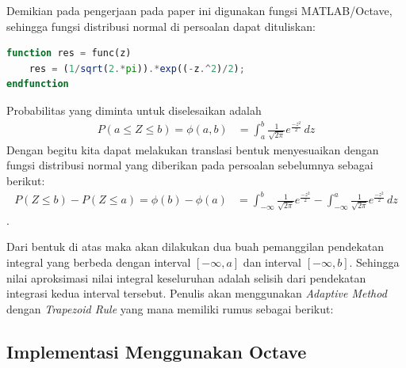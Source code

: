 \documentclass[journal,12pt,onecolumn,a4paper]{IEEEtran}
\begin{document}
\par Demikian pada pengerjaan pada paper ini digunakan fungsi MATLAB/Octave, sehingga fungsi distribusi normal di persoalan dapat dituliskan:
\begin{center}
	\begin{lstlisting}[language=Octave]
function res = func(z)
	res = (1/sqrt(2.*pi)).*exp((-z.^2)/2);
endfunction
	\end{lstlisting}
\end{center}

Probabilitas yang diminta untuk diselesaikan adalah
\begin{equation*}
	\begin{split}
		P(a \le Z \le b )  = \phi(a,b) & = \int_{a}^{b} \frac{1}{\sqrt{2\pi}}e ^{\frac{-z^2}{2}} \,dz
	\end{split}
\end{equation*}
Dengan begitu kita dapat melakukan translasi bentuk menyesuaikan dengan fungsi distribusi normal yang diberikan pada persoalan sebelumnya sebagai berikut:
\begin{equation*}
	\begin{split}
		P(Z \le b ) - P(Z \le a )  = \phi(b)-\phi(a) & =  \int_{-\infty}^{b} \frac{1}{\sqrt{2\pi}}e ^{\frac{-z^2}{2}} - \int_{-\infty}^{a} \frac{1}{\sqrt{2\pi}}e ^{\frac{-z^2}{2}} \,dz
	\end{split}
\end{equation*}.

Dari bentuk di atas maka akan dilakukan dua buah pemanggilan pendekatan integral yang berbeda dengan interval \([-\infty, a]\) dan interval \([-\infty, b]\). Sehingga nilai aproksimasi nilai integral keseluruhan adalah selisih dari pendekatan integrasi kedua interval tersebut.
Penulis akan menggunakan \emph{Adaptive Method} dengan \emph{Trapezoid Rule} yang mana memiliki rumus sebagai berikut:

\subsection{Implementasi Menggunakan Octave}
\end{document}

